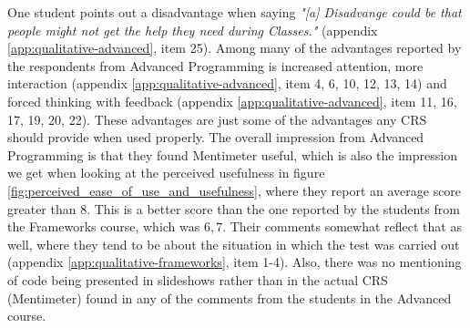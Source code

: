 One student points out a disadvantage when saying \emph{"[a] Disadvange could be that people might not get the help they need during Classes."} (appendix \ref{app:qualitative-advanced}, item 25). 
Among many of the advantages reported by the respondents from Advanced Programming is increased attention, more interaction (appendix \ref{app:qualitative-advanced}, item 4, 6, 10, 12, 13, 14) and forced thinking with feedback (appendix \ref{app:qualitative-advanced}, item 11, 16, 17, 19, 20, 22). These advantages are just some of the advantages any CRS should provide when used properly. The overall impression from Advanced Programming is that they found Mentimeter useful, which is also the impression we get when looking at the perceived usefulness in figure \ref{fig:perceived_ease_of_use_and_usefulness}, where they report an average score greater than 8. This is a better score than the one reported by the students from the Frameworks course, which was $6,7$. Their comments somewhat reflect that as well, where they tend to be about the situation in which the test was carried out (appendix \ref{app:qualitative-frameworks}, item 1-4). Also, there was no mentioning of code being presented in slideshows rather than in the actual CRS (Mentimeter) found in any of the comments from the students in the Advanced course.


